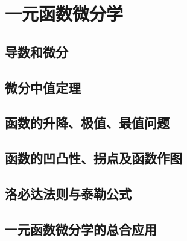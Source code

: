 \chapter{一元函数微分学}
\section{导数和微分}

\section{微分中值定理}

\section{函数的升降、极值、最值问题}

\section{函数的凹凸性、拐点及函数作图}

\section{洛必达法则与泰勒公式}

\section{一元函数微分学的总合应用}